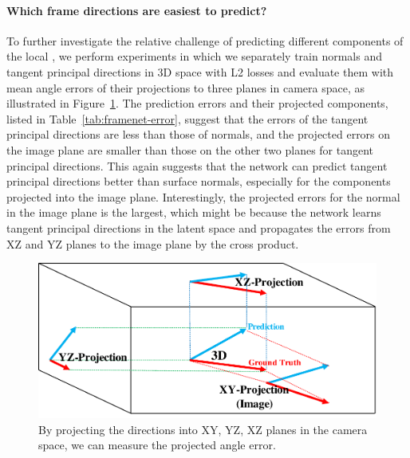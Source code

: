 \paragraph{Which frame directions are easiest to predict?}  To further investigate the relative challenge of predicting different components of the local \cframe{}, we perform experiments in which we separately train normals and tangent principal directions in 3D space with L2 losses and evaluate them with mean angle errors of their projections to three planes in camera space, as illustrated in Figure~\ref{fig:framenet-err-proj}.  The prediction errors and their projected components, listed in Table~\ref{tab:framenet-error}, suggest
that the errors of the tangent principal directions are less than those of normals, and the projected errors on the image plane are smaller than those on the other two planes for tangent principal directions.  This again suggests that the network can predict tangent principal directions better than surface normals, especially for the components projected into the image plane.  Interestingly, the projected errors for the normal in the image plane is the largest, which might be because the network learns tangent principal directions in the latent space and propagates the errors from XZ and YZ planes to the image plane by the cross product.
\begin{figure}
    \centering
    \includegraphics[width=0.6\linewidth]{FrameNet/graph/angleproj.pdf}
    \caption{By projecting the directions into XY, YZ, XZ planes in the camera space, we can measure the projected angle error.}
    \label{fig:framenet-err-proj}
\end{figure}



